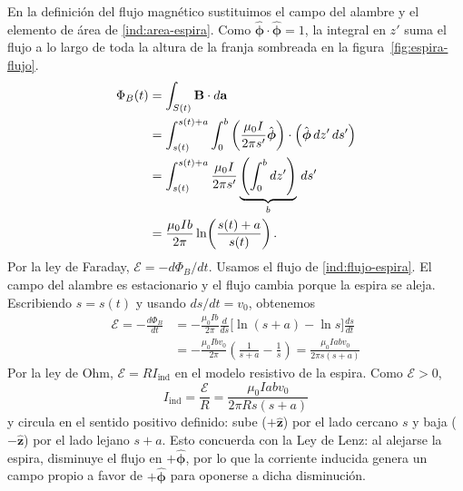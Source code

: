\documentclass[11pt]{article}
\begin{document}
En la definición del flujo magnético sustituimos el campo del
alambre y el elemento de área de \eqref{ind:area-espira}. Como
$\hat{\boldsymbol{\phi}}\cdot\hat{\boldsymbol{\phi}}=1$, la
integral en $z'$ suma el flujo a lo largo de toda la altura
de la franja sombreada en la figura~\ref{fig:espira-flujo}.
\begin{align}
    \Phi_B(t)
    &=\int_{S(t)}\mathbf B\cdot d\mathbf a \notag\\
    &=\int_{s(t)}^{s(t)+a}\int_0^b
      \left(\frac{\mu_0 I}{2\pi s'}\hat{\boldsymbol{\phi}}\right)
      \cdot\left(\hat{\boldsymbol{\phi}}\,dz'\,ds'\right) \notag\\
    &=\int_{s(t)}^{s(t)+a}\frac{\mu_0 I}{2\pi s'}
      \underbrace{\left(\int_0^b dz'\right)}_{b}\,ds' \notag\\
    &=\frac{\mu_0 I b}{2\pi}
      \ln\!\left(\frac{s(t)+a}{s(t)}\right).
    \label{ind:flujo-espira}
\end{align}
Por la ley de Faraday, $\mathcal E=-d\Phi_B/dt$.
Usamos el flujo de \eqref{ind:flujo-espira}.
El campo del alambre es estacionario y el flujo cambia porque
la espira se aleja. Escribiendo $s=s(t)$ y usando $ds/dt=v_0$,
obtenemos
\begin{align}
    \mathcal{E} = -\frac{d\Phi_B}{dt} &= -\frac{\mu_0 I b}{2\pi} \frac{d}{ds}\Big[ \ln(s + a) - \ln s \Big] \frac{ds}{dt} \nonumber \\
    &= -\frac{\mu_0 I b v_0}{2\pi} \left( \frac{1}{s + a} - \frac{1}{s} \right) = \frac{\mu_0 I a b v_0}{2\pi s(s + a)}
\end{align}
Por la ley de Ohm, $\mathcal E=RI_{\text{ind}}$ en el modelo
resistivo de la espira. Como $\mathcal E>0$,
\begin{equation}
    I_{\text{ind}} = \frac{\mathcal{E}}{R} = \frac{\mu_0 I a b v_0}{2\pi R s(s + a)}
\end{equation}
y circula en el sentido positivo definido: sube ($+\hat{\mathbf{z}}$) por el lado cercano $s$ y baja ($-\hat{\mathbf{z}}$) por el lado lejano $s+a$. Esto concuerda con la Ley de Lenz: al alejarse la espira, disminuye el flujo en $+\hat{\boldsymbol{\phi}}$, por lo que la corriente inducida genera un campo propio a favor de $+\hat{\boldsymbol{\phi}}$ para oponerse a dicha disminución.
\end{document}
